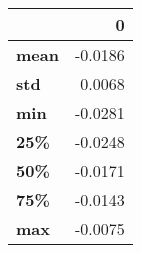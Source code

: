 \begin{tabular}{lr}
\toprule
{} &       0 \\
\midrule
\textbf{mean} & -0.0186 \\
\textbf{std } &  0.0068 \\
\textbf{min } & -0.0281 \\
\textbf{25\% } & -0.0248 \\
\textbf{50\% } & -0.0171 \\
\textbf{75\% } & -0.0143 \\
\textbf{max } & -0.0075 \\
\bottomrule
\end{tabular}
